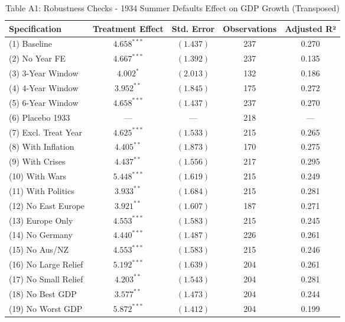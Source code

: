 \begin{table}[htbp]\centering
\renewcommand{\arraystretch}{1.2}
\caption{Table A1: Robustness Checks - 1934 Summer Defaults Effect on GDP Growth (Transposed)}
\label{tab:robustness_1934_transposed}
\begin{adjustbox}{width=\textwidth,center}
\begin{tabular}{@{\extracolsep{5pt}}l*{4}{c}@{}}
\toprule
\textbf{Specification} & \textbf{Treatment Effect} & \textbf{Std. Error} & \textbf{Observations} & \textbf{Adjusted R²} \\
\midrule
(1) Baseline & $4.658^{***}$ & $(1.437)$ & 237 & 0.270 \\
(2) No Year FE & $4.667^{***}$ & $(1.392)$ & 237 & 0.135 \\
(3) 3-Year Window & $4.002^{*}$ & $(2.013)$ & 132 & 0.186 \\
(4) 4-Year Window & $3.952^{**}$ & $(1.845)$ & 175 & 0.272 \\
(5) 6-Year Window & $4.658^{***}$ & $(1.437)$ & 237 & 0.270 \\
(6) Placebo 1933 & --- & --- & 218 & --- \\
(7) Excl. Treat Year & $4.625^{***}$ & $(1.533)$ & 215 & 0.265 \\
(8) With Inflation & $4.405^{**}$ & $(1.873)$ & 170 & 0.275 \\
(9) With Crises & $4.437^{**}$ & $(1.556)$ & 217 & 0.295 \\
(10) With Wars & $5.448^{***}$ & $(1.619)$ & 215 & 0.249 \\
(11) With Politics & $3.933^{**}$ & $(1.684)$ & 215 & 0.281 \\
(12) No East Europe & $3.921^{**}$ & $(1.607)$ & 187 & 0.271 \\
(13) Europe Only & $4.553^{***}$ & $(1.583)$ & 215 & 0.245 \\
(14) No Germany & $4.440^{***}$ & $(1.487)$ & 226 & 0.261 \\
(15) No Aus/NZ & $4.553^{***}$ & $(1.583)$ & 215 & 0.246 \\
(16) No Large Relief & $5.192^{***}$ & $(1.639)$ & 204 & 0.261 \\
(17) No Small Relief & $4.203^{**}$ & $(1.543)$ & 204 & 0.281 \\
(18) No Best GDP & $3.577^{**}$ & $(1.473)$ & 204 & 0.244 \\
(19) No Worst GDP & $5.872^{***}$ & $(1.412)$ & 204 & 0.199 \\
\bottomrule
\end{tabular}
\end{adjustbox}


\end{table}
